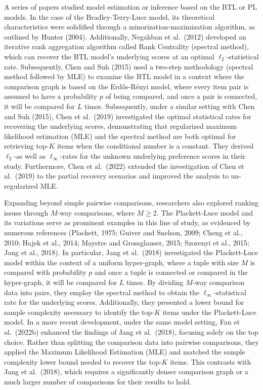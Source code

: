 A series of papers studied model estimation or inference based on the BTL or PL models. In the case of the Bradley-Terry-Luce model, its theoretical characteristics were solidified through a minorization-maximization algorithm, as outlined by Hunter (2004). Additionally, Negahban et al.~(2012) developed an iterative rank aggregation algorithm called Rank Centrality (spectral method), which can recover the BTL model's underlying scores at an optimal \(\ell_2\)-statistical rate. Subsequently, Chen and Suh (2015) used a two-step methodology (spectral method followed by MLE) to examine the BTL model in a context where the comparison graph is based on the Erdős-Rényi model, where every item pair is assumed to have a probability \(p\) of being compared, and once a pair is connected, it will be compared for \(L\) times. Subsequently, under a similar setting with Chen and Suh (2015), Chen et al.~(2019) investigated the optimal statistical rates for recovering the underlying scores, demonstrating that regularized maximum likelihood estimation (MLE) and the spectral method are both optimal for retrieving top-\(K\) items when the conditional number is a constant. They derived \(\ell_2\)-as well as \(\ell_\infty\)-rates for the unknown underlying preference scores in their study. Furthermore, Chen et al.~(2022) extended the investigation of Chen et al.~(2019) to the partial recovery scenarios and improved the analysis to un-regularized MLE.

Expanding beyond simple pairwise comparisons, researchers also explored ranking issues through \(M\)-way comparisons, where \(M \geq 2\). The Plackett-Luce model and its variations serve as prominent examples in this line of study, as evidenced by numerous references (Plackett, 1975; Guiver and Snelson, 2009; Cheng et al., 2010; Hajek et al., 2014; Maystre and Grossglauser, 2015; Szorenyi et al., 2015; Jang et al., 2018). In particular, Jang et al.~(2018) investigated the Plackett-Luce model within the context of a uniform hyper-graph, where a tuple with size \(M\) is compared with probability \(p\) and once a tuple is connected or compared in the hyper-graph, it will be compared for \(L\) times. By dividing \(M\)-way comparison data into pairs, they employ the spectral method to obtain the \(\ell_\infty\)-statistical rate for the underlying scores. Additionally, they presented a lower bound for sample complexity necessary to identify the top-\(K\) items under the Plackett-Luce model. In a more recent development, under the same model setting, Fan et al.~(2022b) enhanced the findings of Jang et al.~(2018), focusing solely on the top choice. Rather than splitting the comparison data into pairwise comparisons, they applied the Maximum Likelihood Estimation (MLE) and matched the sample complexity lower bound needed to recover the top-\(K\) items. This contrasts with Jang et al.~(2018), which requires a significantly denser comparison graph or a much larger number of comparisons for their results to hold.

